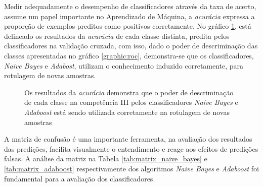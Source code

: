 Medir adequadamente o desempenho de classificadores através da taxa de acerto, 
assume um papel importante no Aprendizado de Máquina, a \textit{acurácia} 
expressa a proporção de exemplos preditos como positivos corretamente. No 
gráfico \ref{graphic:acuracia}, está delineado os resultados da 
\textit{acurácia} de cada classe distinta, predita pelos classificadores na 
validação cruzada, com isso, dado o poder de descriminação das classes 
apresentadas no gráfico \ref{graphic:roc}, demonstra-se que os classificadores, 
\textit{Naive Bayes} e \textit{Adabost}, utilizam o conhecimento induzido 
corretamente, para rotulagem de novas amostras.

\begin{figure}[H]
    \begin{center}
    \end{center}
    \caption{Os resultados da \textit{acurácia} demonstra que o poder de 
    descriminação de cada classe na competência III pelos classificadores 
    \textit{Naive Bayes} e \textit{Adaboost} está sendo utilizada corretamente 
    na rotulagem de novas amostras}
    \label{graphic:acuracia}
\end{figure}

A matriz de confusão é uma importante ferramenta, na avaliação dos resultados 
das predições, facilita visualmente o entendimento e reage aos efeitos de 
predições falsas. A análise da matriz na Tabela \ref{tab:matrix_naive_bayes} e 
\ref{tab:matrix_adaboost} respectivamente dos algoritmos \textit{Naive Bayes} e 
\textit{Adaboost} foi fundamental para a avaliação dos classificadores.

